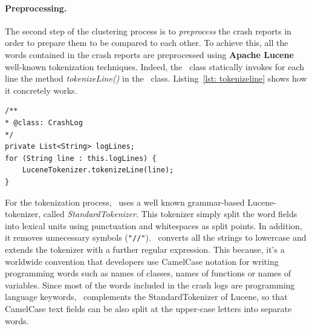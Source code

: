 \paragraph{Preprocessing.}
The second step of the clustering process is to \textit{preprocess} the crash reports in order to prepare them to be compared to each other. 
To achieve this, all the words contained in the crash reports are preprocessed using \textbf{Apache Lucene} \cite{lucene} well-known tokenization techniques.  
Indeed, the \Crash\ class statically invokes for each line the method \textit{tokenizeLine()} in the \Lucene\ class. Listing~\ref{lst: tokenizeline} shows how it concretely works. 
\begin{lstlisting}[caption=Each line inside the crash report is tokenized using \Lucene,label={lst: tokenizeline}]
/**
* @class: CrashLog
*/
private List<String> logLines;
for (String line : this.logLines) {
	LuceneTokenizer.tokenizeLine(line);
}
\end{lstlisting} 
For the tokenization process, \toolname\ uses a well known grammar-based  Lucene-tokenizer, called \textit{StandardTokenizer}. This tokenizer simply split the word fields into lexical units using punctuation and whitespaces as split points. In addition, it removes unnecessary symbols (\eg \texttt{"//"}).
\toolname\ converts all the strings to lowercase and extends the tokenizer with a further regular expression. This because, it's a worldwide convention that developers use CamelCase notation for writing programming words such as names of classes, names of functions or names of variables.
Since most of the words included in the crash logs are programming language keywords, \toolname\ complements the StandardTokenizer of Lucene, so that CamelCase text fields can be also split at the upper-case letters into separate words. 
\clearpage




